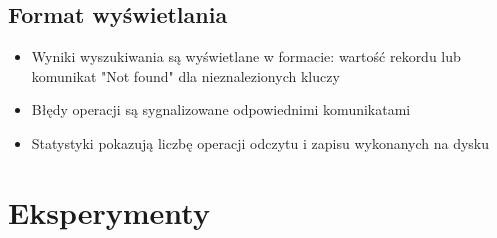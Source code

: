 \documentclass[12pt]{article}
\begin{document}
\subsection{Format wyświetlania}
\begin{itemize}
    \item Wyniki wyszukiwania są wyświetlane w formacie: wartość rekordu lub komunikat "Not found" dla nieznalezionych kluczy
    \item Błędy operacji są sygnalizowane odpowiednimi komunikatami
    \item Statystyki pokazują liczbę operacji odczytu i zapisu wykonanych na dysku
\end{itemize}

\section{Eksperymenty}
\end{document}
